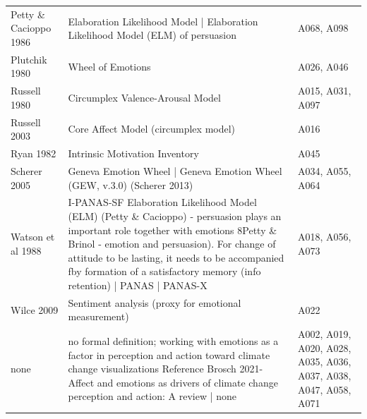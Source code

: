 \begin{table}[t]
\begin{tabular*}{\textwidth}{@{\extracolsep{\fill}} p{} p{} p{} @{} }
Petty \& Cacioppo 1986 & Elaboration Likelihood Model | Elaboration Likelihood Model (ELM) of persuasion & A068, A098 \\
Plutchik 1980 & Wheel of Emotions & A026, A046 \\
Russell 1980 & Circumplex Valence-Arousal Model & A015, A031, A097 \\
Russell 2003 & Core Affect Model (circumplex model) & A016 \\
Ryan 1982 & Intrinsic Motivation Inventory & A045 \\
Scherer 2005 & Geneva Emotion Wheel | Geneva Emotion Wheel (GEW, v.3.0) (Scherer 2013) & A034, A055, A064 \\
Watson et al 1988 & I-PANAS-SF 
Elaboration Likelihood Model (ELM) (Petty \& Cacioppo) - persuasion plays an important role together with emotions 8Petty \& Brinol - emotion and persuasion). For change of attitude to be lasting, it needs to be accompanied fby formation of a satisfactory memory (info retention) | PANAS | PANAS-X & A018, A056, A073 \\
Wilce 2009 & Sentiment analysis (proxy for emotional measurement) & A022 \\
none & no formal definition; working with emotions as a factor in perception and action toward climate change visualizations
Reference Brosch 2021- Affect and emotions as drivers of climate change perception and action: A review | none & A002, A019, A020, A028, A035, A036, A037, A038, A047, A058, A071 \\
\hline
\end{tabular*}
\end{table}